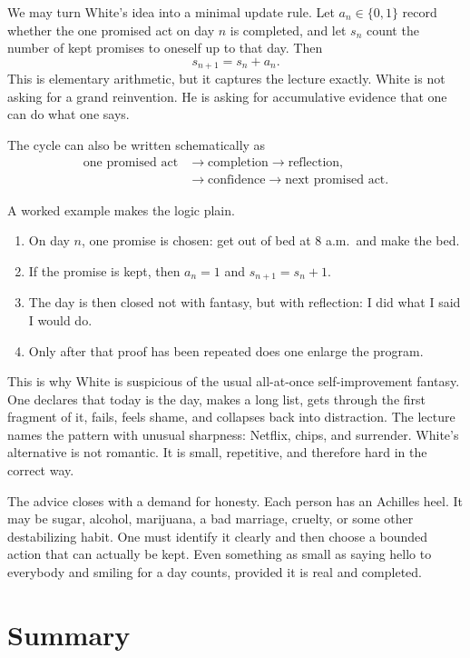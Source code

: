 We may turn White's idea into a minimal update rule. Let \(a_n\in\{0,1\}\) record whether the one promised act on day \(n\) is completed, and let \(s_n\) count the number of kept promises to oneself up to that day. Then
\begin{equation}
s_{n+1}=s_n+a_n.
\end{equation}
This is elementary arithmetic, but it captures the lecture exactly. White is not asking for a grand reinvention. He is asking for accumulative evidence that one can do what one says.

The cycle can also be written schematically as
\begin{align}
\text{one promised act} &\to \text{completion} \to \text{reflection},\\
&\to \text{confidence} \to \text{next promised act}.
\end{align}

A worked example makes the logic plain.
\begin{enumerate}
\item On day \(n\), one promise is chosen: get out of bed at 8 a.m.\ and make the bed.
\item If the promise is kept, then \(a_n=1\) and \(s_{n+1}=s_n+1\).
\item The day is then closed not with fantasy, but with reflection: I did what I said I would do.
\item Only after that proof has been repeated does one enlarge the program.
\end{enumerate}

This is why White is suspicious of the usual all-at-once self-improvement fantasy. One declares that today is the day, makes a long list, gets through the first fragment of it, fails, feels shame, and collapses back into distraction. The lecture names the pattern with unusual sharpness: Netflix, chips, and surrender. White's alternative is not romantic. It is small, repetitive, and therefore hard in the correct way.

The advice closes with a demand for honesty. Each person has an Achilles heel. It may be sugar, alcohol, marijuana, a bad marriage, cruelty, or some other destabilizing habit. One must identify it clearly and then choose a bounded action that can actually be kept. Even something as small as saying hello to everybody and smiling for a day counts, provided it is real and completed.

\section{Summary}

